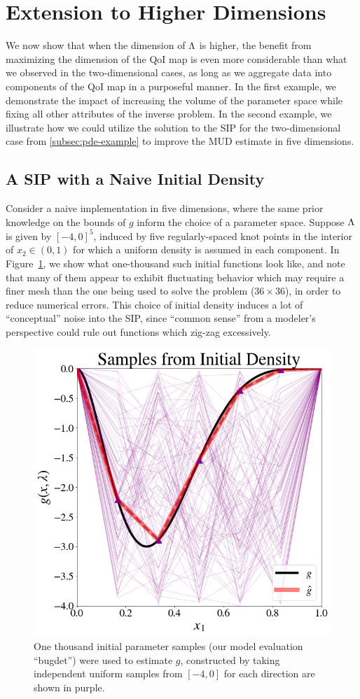 \section{Extension to Higher Dimensions}\label{sec:mud-higher-dimensions}
We now show that when the dimension of ${\Lambda}$ is higher, the benefit from maximizing the dimension of the QoI map is even more considerable than what we observed in the two-dimensional cases, as long as we aggregate data into components of the QoI map in a purposeful manner.
In the first example, we demonstrate the impact of increasing the volume of the parameter space while fixing all other attributes of the inverse problem.
In the second example, we illustrate how we could utilize the solution to the SIP for the two-dimensional case from \ref{subsec:pde-example} to improve the MUD estimate in five dimensions.

\subsection{A SIP with a Naive Initial Density}
Consider a naive implementation in five dimensions, where the same prior knowledge on the bounds of $g$ inform the choice of a parameter space.
Suppose ${\Lambda}$ is given by $[-4, 0]^5$, induced by five regularly-spaced knot points in the interior of $x_2 \in (0,1)$ for which a uniform density is assumed in each component.
In Figure~\ref{fig:pde-highd-initial-5d}, we show what one-thousand such initial functions look like, and note that many of them appear to exhibit fluctuating behavior which may require a finer mesh than the one being used to solve the problem ($36\times36$), in order to reduce numerical errors.
This choice of initial density induces a lot of ``conceptual'' noise into the SIP, since ``common sense'' from a modeler's perspective could rule out functions which zig-zag excessively.

\begin{figure}
\centering
  \includegraphics[width=0.475\linewidth]{figures/pde-highd/pde-highd_init_D5.png}
\caption{
One thousand initial parameter samples (our model evaluation ``bugdet'') were used to estimate $g$, constructed by taking independent uniform samples from $[-4, 0]$ for each direction are shown in purple.
}
\label{fig:pde-highd-initial-5d}
\end{figure}

